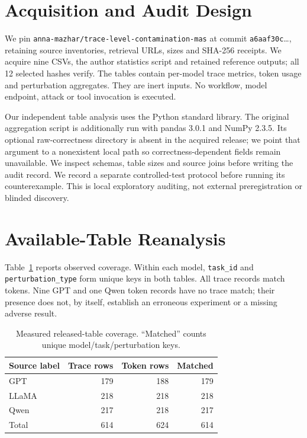 \documentclass[sigconf,nonacm]{acmart}
\begin{document}
\section{Acquisition and Audit Design}
We pin \texttt{anna-mazhar/trace-level-contamination-mas} at commit \texttt{a6aaf30c}\ldots, retaining source inventories, retrieval URLs, sizes and SHA-256 receipts. We acquire nine CSVs, the author statistics script and retained reference outputs; all 12 selected hashes verify. The tables contain per-model trace metrics, token usage and perturbation aggregates. They are inert inputs. No workflow, model endpoint, attack or tool invocation is executed.

Our independent table analysis uses the Python standard library. The original aggregation script is additionally run with pandas 3.0.1 and NumPy 2.3.5. Its optional raw-correctness directory is absent in the acquired release; we point that argument to a nonexistent local path so correctness-dependent fields remain unavailable. We inspect schemas, table sizes and source joins before writing the audit record. We record a separate controlled-test protocol before running its counterexample. This is local exploratory auditing, not external preregistration or blinded discovery.

\section{Available-Table Reanalysis}
Table~\ref{tab:coverage} reports observed coverage. Within each model, \texttt{task\_id} and \texttt{perturbation\_type} form unique keys in both tables. All trace records match tokens. Nine GPT and one Qwen token records have no trace match; their presence does not, by itself, establish an erroneous experiment or a missing adverse result.

\begin{table}[t]
\caption{Measured released-table coverage. ``Matched'' counts unique model/task/perturbation keys.}
\label{tab:coverage}\centering\small
\begin{tabular}{lrrr}\toprule
Source label & Trace rows & Token rows & Matched\\\midrule
GPT & 179 & 188 & 179\\
LLaMA & 218 & 218 & 218\\
Qwen & 217 & 218 & 217\\\midrule
Total & 614 & 624 & 614\\\bottomrule
\end{tabular}
\end{table}
\end{document}
